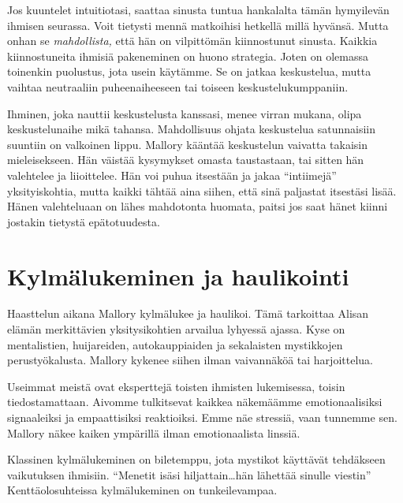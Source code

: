 Jos kuuntelet intuitiotasi, saattaa sinusta tuntua hankalalta tämän hymyilevän ihmisen seurassa. Voit tietysti mennä matkoihisi hetkellä millä hyvänsä. Mutta onhan se \emph{mahdollista,} että hän on vilpittömän kiinnostunut sinusta. Kaikkia kiinnostuneita ihmisiä pakeneminen on huono strategia. Joten on olemassa toinenkin puolustus, jota usein käytämme. Se on jatkaa keskustelua, mutta vaihtaa neutraaliin puheenaiheeseen tai toiseen keskustelukumppaniin.

Ihminen, joka nauttii keskustelusta kanssasi, menee virran mukana, olipa keskustelunaihe mikä tahansa. Mahdollisuus ohjata keskustelua satunnaisiin suuntiin on valkoinen lippu. Mallory kääntää keskustelun vaivatta takaisin mieleisekseen. Hän väistää kysymykset omasta taustastaan, tai sitten hän valehtelee ja liioittelee. Hän voi puhua itsestään ja jakaa ``intiimejä'' yksityiskohtia, mutta kaikki tähtää aina siihen, että sinä paljastat itsestäsi lisää. Hänen valehteluaan on lähes mahdotonta huomata, paitsi jos saat hänet kiinni jostakin tietystä epätotuudesta.

\section{Kylmälukeminen ja haulikointi}

Haasttelun aikana Mallory kylmälukee ja haulikoi. Tämä tarkoittaa Alisan elämän merkittävien yksitysikohtien arvailua lyhyessä ajassa. Kyse on mentalistien, huijareiden, autokauppiaiden ja sekalaisten mystikkojen perustyökalusta. Mallory kykenee siihen ilman vaivannäköä tai harjoittelua.

Useimmat meistä ovat eksperttejä toisten ihmisten lukemisessa, toisin tiedostamattaan. Aivomme tulkitsevat kaikkea näkemäämme emotionaalisiksi signaaleiksi ja empaattisiksi reaktioiksi. Emme näe stressiä, vaan tunnemme sen. Mallory näkee kaiken ympärillä ilman emotionaalista linssiä.

Klassinen kylmälukeminen on biletemppu, jota mystikot käyttävät tehdäkseen vaikutuksen ihmisiin. ``Menetit isäsi hiljattain\ldots hän lähettää sinulle viestin'' Kenttäolosuhteissa kylmälukeminen on tunkeilevampaa.

